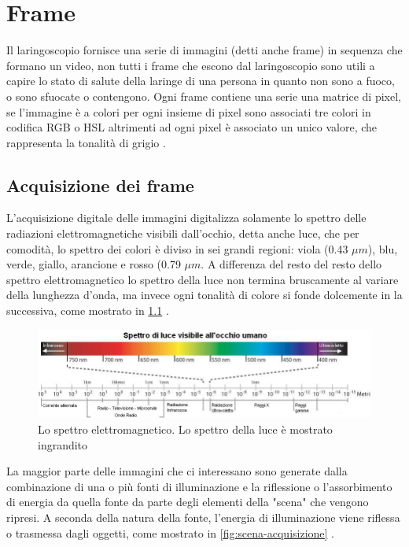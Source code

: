 \chapter{Frame}\label{frame}

Il laringoscopio fornisce una serie di immagini (detti anche frame) in sequenza che formano un video, non tutti i frame che escono dal laringoscopio sono utili a capire lo stato di salute della laringe di una persona in quanto non sono a fuoco, o sono sfuocate o contengono. Ogni frame contiene una serie una matrice di pixel, se l'immagine è a colori per ogni insieme di pixel sono associati tre colori in codifica RGB o HSL altrimenti ad ogni pixel è associato un unico valore, che rappresenta la tonalità di grigio \cite{gonzalez_dip}.

\section{Acquisizione dei frame}\label{acquisizione-dei-frame}

L'acquisizione digitale delle immagini digitalizza solamente lo spettro delle radiazioni elettromagnetiche visibili dall'occhio, detta anche luce, che per comodità, lo spettro dei colori è diviso in sei grandi regioni: viola (0.43 \(\mu m\)), blu, verde, giallo, arancione e rosso (0.79 \(\mu m\). A differenza del resto del resto dello spettro elettromagnetico lo spettro della luce non termina bruscamente al variare della lunghezza d'onda, ma invece ogni tonalità di colore si fonde dolcemente in
la successiva, come mostrato in \cref{fig:spettro-onde} \cite{gonzalez_dip}.

\begin{figure}[ht]
    \centering
    \includegraphics[width=1\textwidth]{frame/Spettro-onde.jpg}
    \caption{Lo spettro elettromagnetico. Lo spettro della luce è mostrato ingrandito}
    \label{fig:spettro-onde}
\end{figure}

La maggior parte delle immagini che ci interessano sono generate dalla combinazione di una o più fonti di illuminazione e la riflessione o l'assorbimento di energia da quella fonte da parte degli elementi della "scena" che vengono ripresi. A seconda della natura della fonte, l'energia di illuminazione viene riflessa o trasmessa dagli oggetti, come mostrato in \cref{fig:scena-acquisizione} \cite{gonzalez_dip}.

